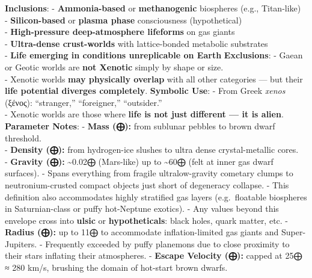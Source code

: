 \documentclass[
  letterpaper,
]{book}
\begin{document}
\textbf{Inclusions}: - \textbf{Ammonia-based} or \textbf{methanogenic}
biospheres (e.g., Titan-like)\\
- \textbf{Silicon-based} or \textbf{plasma phase} consciousness
(hypothetical)\\
- \textbf{High-pressure deep-atmosphere lifeforms} on gas giants\\
- \textbf{Ultra-dense crust-worlds} with lattice-bonded metabolic
substrates\\
- \textbf{Life emerging in conditions unreplicable on Earth}
\textbf{Exclusions}: - Gaean or Geotic worlds are \textbf{not Xenotic}
simply by shape or size.\\
- Xenotic worlds \textbf{may physically overlap} with all other
categories --- but their \textbf{life potential diverges completely}.
\textbf{Symbolic Use}: - From Greek \emph{xenos} (ξένος): ``stranger,''
``foreigner,'' ``outsider.''\\
- Xenotic worlds are those where \textbf{life is not just different ---
it is alien}. \textbf{Parameter Notes}: - \textbf{Mass (⨁):} from
sublunar pebbles to brown dwarf threshold.\\
- \textbf{Density (⨁):} from hydrogen-ice slushes to ultra dense
crystal-metallic cores.\\
- \textbf{Gravity (⨁):} \textasciitilde0.02⨁ (Mars-like) up to
\textasciitilde60⨁ (felt at inner gas dwarf surfaces). - Spans
everything from fragile ultralow-gravity cometary clumps to
neutronium-crusted compact objects just short of degeneracy collapse. -
This definition also accommodates highly stratified gas layers
(e.g.~floatable biospheres in Saturnian-class or puffy hot-Neptune
exotics). - Any values beyond this envelope cross into \textbf{ulsic} or
\textbf{hypotheticals}: black holes, quark matter, etc. - \textbf{Radius
(⨁):} up to 11⨁ to accommodate inflation-limited gas giants and
Super-Jupiters. - Frequently exceeded by puffy planemons due to close
proximity to their stars inflating their atmospheres. - \textbf{Escape
Velocity (⨁):} capped at 25⨁ ≈ 280 km/s, brushing the domain of
hot-start brown dwarfs.
\end{document}
